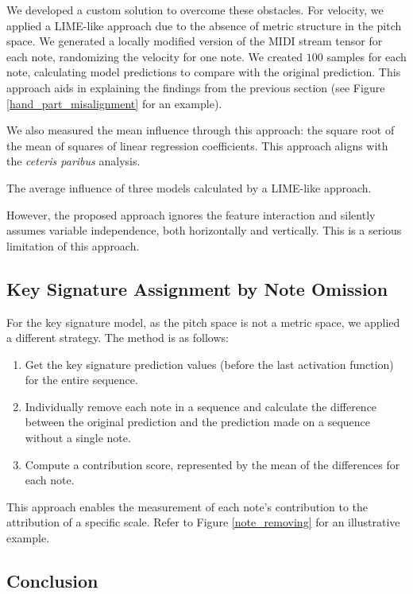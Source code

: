 We developed a custom solution to overcome these obstacles. For velocity, we applied a LIME-like approach due to the absence of metric structure in the pitch space. We generated a locally modified version of the MIDI stream tensor for each note, randomizing the velocity for one note. We created $100$ samples for each note, calculating model predictions to compare with the original prediction. This approach aids in explaining the findings from the previous section (see Figure \ref{hand_part_misalignment} for an example).

We also measured the mean influence through this approach: the square root of the mean of squares of linear regression coefficients. This approach aligns with the \emph{ceteris paribus} analysis.

\begin{table}[ht!]

\caption{The average influence of three models calculated by a LIME-like approach.}
\end{table} 

However, the proposed approach ignores the feature interaction and silently assumes variable independence, both horizontally and vertically. This is a serious limitation of this approach. 

\subsection{Key Signature Assignment by Note Omission}

For the key signature model, as the pitch space is not a metric space, we applied a different strategy. The method is as follows: 
\begin{enumerate}[noitemsep, topsep=4pt]
	\item Get the key signature prediction values (before the last activation function) for the entire sequence.
	\item Individually remove each note in a sequence and calculate the difference between the original prediction and the prediction made on a sequence without a single note.
	\item Compute a contribution score, represented by the mean of the differences for each note.
	\end{enumerate} This approach enables the measurement of each note's contribution to the attribution of a specific scale. Refer to Figure \ref{note_removing} for an illustrative example.

\subsection{Conclusion}

